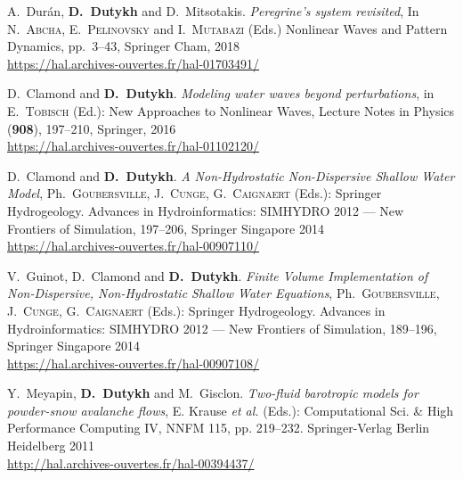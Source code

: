 \begin{etaremune}
  
  
    \item A.~Dur\'an, \textbf{D.~Dutykh} and D.~Mitsotakis. \textit{Peregrine's system revisited}, In N.~\textsc{Abcha}, E.~\textsc{Pelinovsky} and I.~\textsc{Mutabazi} (Eds.) Nonlinear Waves and Pattern Dynamics, pp.~3--43, Springer Cham, 2018 \\ %
    \url{https://hal.archives-ouvertes.fr/hal-01703491/}
    
  
  
    \item D.~Clamond and \textbf{D.~Dutykh}. \textit{Modeling water waves beyond perturbations}, in E.~\textsc{Tobisch} (Ed.): New Approaches to Nonlinear Waves, Lecture Notes in Physics (\textbf{908}), 197--210, Springer, 2016 \\ %
    \url{https://hal.archives-ouvertes.fr/hal-01102120/}
    
  
  
    \item D.~Clamond and \textbf{D.~Dutykh}. \textit{A Non-Hydrostatic Non-Dispersive Shallow Water Model}, Ph.~\textsc{Goubersville}, J.~\textsc{Cunge}, G.~\textsc{Caignaert} (Eds.): Springer Hydrogeology. Advances in Hydroinformatics: SIMHYDRO 2012 --- New Frontiers of Simulation, 197--206, Springer Singapore 2014 \\ %
    \url{https://hal.archives-ouvertes.fr/hal-00907110/}
  
    \item V.~Guinot, D.~Clamond and \textbf{D.~Dutykh}. \textit{Finite Volume Implementation of Non-Dispersive, Non-Hydrostatic Shallow Water Equations}, Ph.~\textsc{Goubersville}, J.~\textsc{Cunge}, G.~\textsc{Caignaert} (Eds.): Springer Hydrogeology. Advances in Hydroinformatics: SIMHYDRO 2012 --- New Frontiers of Simulation, 189--196, Springer Singapore 2014 \\ %
    \url{https://hal.archives-ouvertes.fr/hal-00907108/}
    
  
  
    \item Y.~Meyapin, \textbf{D.~Dutykh} and M.~Gisclon. \textit{Two-fluid barotropic models for powder-snow avalanche flows}, E. Krause \emph{et al.} (Eds.): Computational Sci. \& High Performance Computing IV, NNFM 115, pp. 219--232. Springer-Verlag Berlin Heidelberg 2011 \\ %
    \url{http://hal.archives-ouvertes.fr/hal-00394437/}
    

\end{etaremune}
